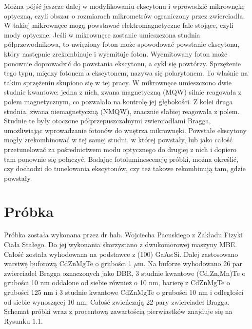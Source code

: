 \documentclass[licencjacka]{pracamgr}
\begin{document}
Można pójść jeszcze dalej w modyfikowaniu ekscytonu i wprowadzić mikrownękę optyczną, czyli obszar o rozmiarach mikrometrów ograniczony przez zwierciadła. W takiej mikrownęce mogą powstawać elektromagnetyczne fale stojące, czyli mody optyczne. Jeśli w mikrownęce zostanie umieszczona studnia półprzewodnikowa, to uwięziony foton może spowodować powstanie ekscytonu, który następnie zrekombinuje i wyemituje foton. Wyemitowany foton może ponownie doprowadzić do powstania ekscytonu, a cykl się powtórzy. Sprzężenie tego typu, między fotonem a ekscytonem, nazywa się polarytonem. %
 To właśnie na takim sprzężeniu skupiono się w tej pracy. W mikrownęce umieszczono dwie studnie kwantowe: jedna z nich, zwana magnetyczną (MQW) silnie reagowała z polem magnetycznym, co pozwalało na kontrolę jej głębokości. Z kolei druga studnia, zwana niemagnetyczną (NMQW), znacznie słabiej reagowała z polem. Studnie te były otoczone półprzepuszczalnymi zwierciadłami Bragga, umożliwiając wprowadzanie fotonów do wnętrza mikrownęki. Powstałe ekscytony mogły zrekombinować w tej samej studni, w której powstały, lub jako całość przetunelować za pośrednictwem modu optycznego do drugiej z nich i dopiero tam ponownie się połączyć. Badając fotoluminescencję próbki, można określić, czy dochodzi do tunelowania ekscytonów, czy też takowe rekombinują tam, gdzie powstały.

\chapter{Próbka}\label{r:probka}
Próbka została wykonana przez dr hab. Wojciecha Pacuskiego z Zakładu Fizyki Ciała Stałego. Do jej wykonania skorzystano z dwukomorowej maszyny MBE. Całość została wyhodowana na podstawce z (100) GaAs:Si. Dalej zastosowano warstwę buforową CdZnMgTe o grubości 1 $\mu$m. Na buforze wyhodowano 26 par zwierciadeł Bragga oznaczonych jako DBR, 3 studnie kwantowe (Cd,Zn,Mn)Te o grubości 10 nm oddalone od siebie również o 10 nm, barierę z CdZnMgTe o grubości 125 nm i 3 studnie kwantowe CdZnMgTe o grubości 10 nm i odległości od siebie wynoszącej 10 nm. Całość zwieńczają 22 pary zwierciadeł Bragga. Schemat próbki wraz z procentową zawartością pierwiastków znajduje się na Rysunku 1.1.
\end{document}
